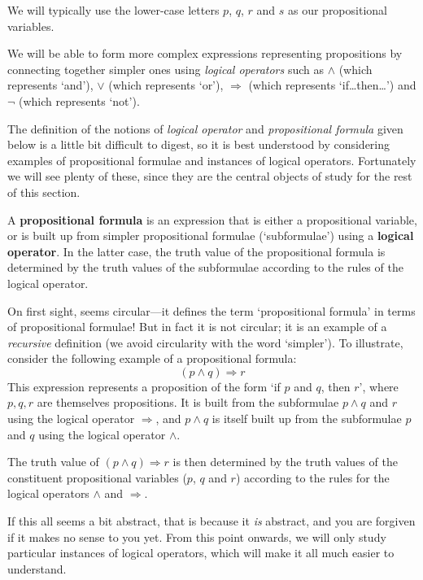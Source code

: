 We will typically use the lower-case letters $p$, $q$, $r$ and $s$ as our propositional variables.

We will be able to form more complex expressions representing propositions by connecting together simpler ones using \textit{logical operators} such as $\wedge$ (which represents `and'), $\vee$ (which represents `or'), $\Rightarrow$ (which represents `if\dots{}then\dots{}') and $\neg$ (which represents `not').

The definition of the notions of \textit{logical operator} and \textit{propositional formula} given below is a little bit difficult to digest, so it is best understood by considering examples of propositional formulae and instances of logical operators. Fortunately we will see plenty of these, since they are the central objects of study for the rest of this section.

\begin{definition}
\label{defPropositionalFormula}
\label{defLogicalOperator}
A \textbf{propositional formula} is an expression that is either a propositional variable, or is built up from simpler propositional formulae (`subformulae') using a \textbf{\mbox{logical} \mbox{operator}}. In the latter case, the truth value of the propositional formula is determined by the truth values of the subformulae according to the rules of the logical operator.
\end{definition}

On first sight,  seems circular---it defines the term `propositional formula' in terms of propositional formulae! But in fact it is not circular; it is an example of a \textit{recursive} definition (we avoid circularity with the word `simpler'). To illustrate, consider the following example of a propositional formula:
\[
(p \wedge q) \Rightarrow r
\]
This expression represents a proposition of the form `if $p$ and $q$, then $r$', where $p,q,r$ are themselves propositions. It is built from the subformulae $p \wedge q$ and $r$ using the logical operator $\Rightarrow$, and $p \wedge q$ is itself built up from the subformulae $p$ and $q$ using the logical operator $\wedge$.

The truth value of $(p \wedge q) \Rightarrow r$ is then determined by the truth values of the constituent propositional variables ($p$, $q$ and $r$) according to the rules for the logical operators $\wedge$ and $\Rightarrow$.

If this all seems a bit abstract, that is because it \textit{is} abstract, and you are forgiven if it makes no sense to you yet. From this point onwards, we will only study particular instances of logical operators, which will make it all much easier to understand.

